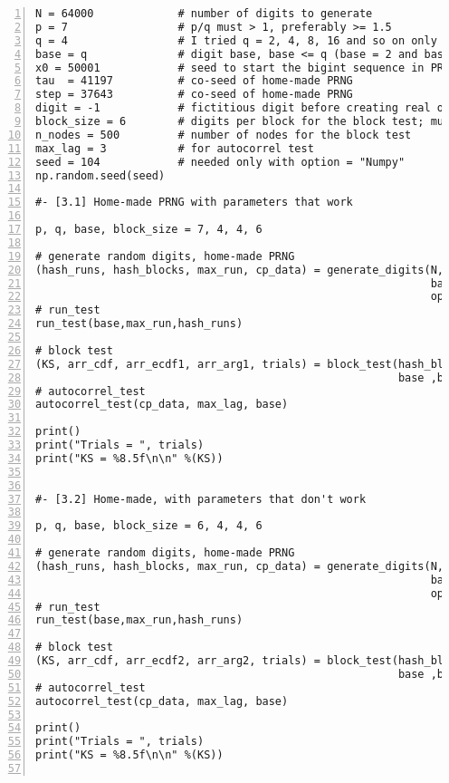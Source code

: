 \documentclass[oneside,10pt]{book}
\begin{document}
\begin{lstlisting}[numbers=left]
N = 64000             # number of digits to generate
p = 7                 # p/q must > 1, preferably >= 1.5 
q = 4                 # I tried q = 2, 4, 8, 16 and so on only 
base = q              # digit base, base <= q (base = 2 and base = q work) 
x0 = 50001            # seed to start the bigint sequence in PRNG
tau  = 41197          # co-seed of home-made PRNG
step = 37643          # co-seed of home-made PRNG
digit = -1            # fictitious digit before creating real ones 
block_size = 6        # digits per block for the block test; must be integer > 0
n_nodes = 500         # number of nodes for the block test
max_lag = 3           # for autocorrel test
seed = 104            # needed only with option = "Numpy"
np.random.seed(seed)  

#- [3.1] Home-made PRNG with parameters that work

p, q, base, block_size = 7, 4, 4, 6

# generate random digits, home-made PRNG
(hash_runs, hash_blocks, max_run, cp_data) = generate_digits(N, x0, p, q, tau, step,  
                                                             base, block_size, max_lag, 
                                                             option="Home-Made")
# run_test
run_test(base,max_run,hash_runs)

# block test
(KS, arr_cdf, arr_ecdf1, arr_arg1, trials) = block_test(hash_blocks, n_nodes, 
                                                        base ,block_size)
# autocorrel_test 
autocorrel_test(cp_data, max_lag, base) 

print()
print("Trials = ", trials)
print("KS = %8.5f\n\n" %(KS))


#- [3.2] Home-made, with parameters that don't work

p, q, base, block_size = 6, 4, 4, 6   

# generate random digits, home-made PRNG
(hash_runs, hash_blocks, max_run, cp_data) = generate_digits(N, x0, p, q, tau, step,  
                                                             base, block_size, max_lag, 
                                                             option="Home-Made")
# run_test
run_test(base,max_run,hash_runs)

# block test
(KS, arr_cdf, arr_ecdf2, arr_arg2, trials) = block_test(hash_blocks, n_nodes, 
                                                        base ,block_size)
# autocorrel_test 
autocorrel_test(cp_data, max_lag, base) 

print()
print("Trials = ", trials)
print("KS = %8.5f\n\n" %(KS))


\end{lstlisting}
\end{document}
